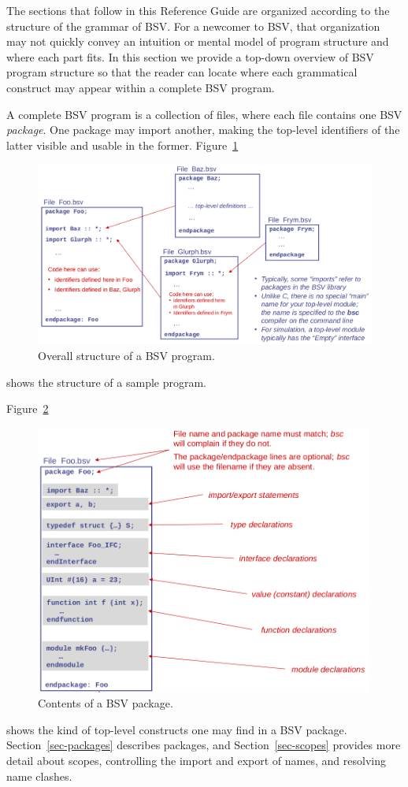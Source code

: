 \documentclass[twoside,letterpaper]{article}
\newcommand{\BSV}{BSV}
\begin{document}
The sections that follow in this Reference Guide are organized
according to the structure of the grammar of {\BSV}.  For a newcomer
to {\BSV}, that organization may not quickly convey an intuition or
mental model of program structure and where each part fits.  In this
section we provide a top-down overview of {\BSV} program structure so
that the reader can locate where each grammatical construct may appear
within a complete {\BSV} program.

A complete {\BSV} program is a collection of files, where each file
contains one {\BSV} \emph{package}.  One package may import another,
making the top-level identifiers of the latter visible and usable in
the former.  Figure~\ref{fig_OverallStructure}
\begin{figure}[htbp]
    \centerline{\includegraphics[width=\textwidth]{Figures/fig_Overall_Structure}}
    \caption{%
        \label{fig_OverallStructure}
        Overall structure of a {\BSV} program.
    }
\end{figure}
shows the structure of a sample program.

Figure~\ref{fig_Contents_Package}
\begin{figure}[htbp]
    \centerline{\includegraphics[height=3.5in]{Figures/fig_Contents_Package}}
    \caption{%
        \label{fig_Contents_Package}
        Contents of a {\BSV} package.
    }
\end{figure}
shows the kind of top-level constructs one may find in a {\BSV}
package.  Section~\ref{sec-packages} describes packages, and
Section~\ref{sec-scopes} provides more detail about scopes,
controlling the import and export of names, and resolving name
clashes.
\end{document}
